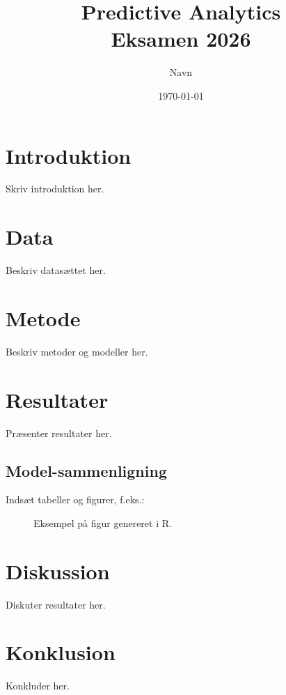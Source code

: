 \documentclass[12pt, a4paper]{article}
\title{Predictive Analytics\\[0.5em]\large Eksamen 2026}
\author{Navn}
\date{\today}
\begin{document}
\maketitle
\tableofcontents
\newpage

\section{Introduktion}
Skriv introduktion her.

\section{Data}
Beskriv datasættet her.

\section{Metode}
Beskriv metoder og modeller her.

\section{Resultater}
Præsenter resultater her.

\subsection{Model-sammenligning}
Indsæt tabeller og figurer, f.eks.:

\begin{figure}[H]
  \centering
  \caption{Eksempel på figur genereret i R.}
  \label{fig:example}
\end{figure}

\section{Diskussion}
Diskuter resultater her.

\section{Konklusion}
Konkluder her.


% 
\end{document}
